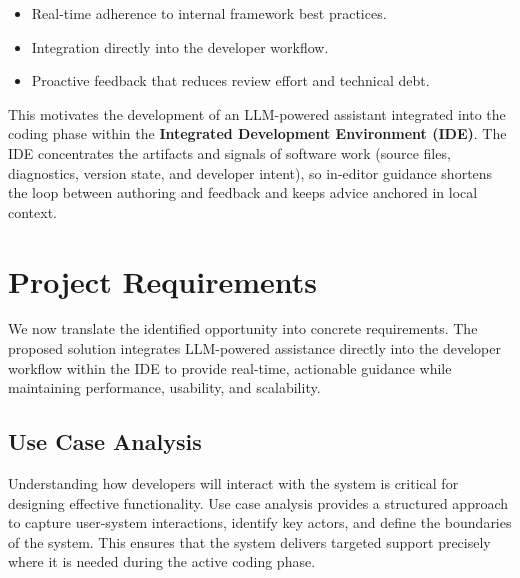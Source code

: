 \begin{spacing}{1.2}
\begin{itemize}
\item Real-time adherence to internal framework best practices.
\item Integration directly into the developer workflow.
\item Proactive feedback that reduces review effort and technical debt.
\end{itemize}

This motivates the development of an LLM-powered assistant integrated into the coding phase within the \textbf{Integrated Development Environment (IDE)}. The IDE concentrates the artifacts and signals of software work (source files, diagnostics, version state, and developer intent), so in‑editor guidance shortens the loop between authoring and feedback and keeps advice anchored in local context.
\section{Project Requirements}

We now translate the identified opportunity into concrete requirements. The proposed solution integrates LLM-powered assistance directly into the developer workflow within the IDE to provide real-time, actionable guidance while maintaining performance, usability, and scalability.

\subsection{Use Case Analysis}

Understanding how developers will interact with the system is critical for designing effective functionality. Use case analysis provides a structured approach to capture user-system interactions, identify key actors, and define the boundaries of the system. This ensures that the system delivers targeted support precisely where it is needed during the active coding phase.


\end{spacing}
